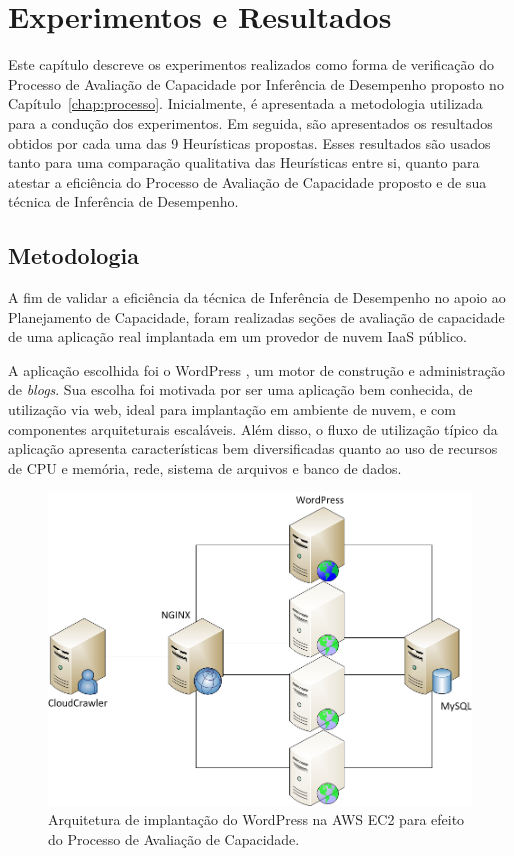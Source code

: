 \chapter{Experimentos e Resultados}
\label{chap:resultados}
Este capítulo descreve os experimentos realizados como forma de
verificação do Processo de Avaliação de Capacidade por Inferência de 
Desempenho proposto no Capítulo~\ref{chap:processo}. Inicialmente, é
apresentada a metodologia utilizada para a condução dos experimentos. Em seguida, 
são apresentados os resultados obtidos por cada uma das 9 Heurísticas propostas. Esses resultados são usados 
tanto para uma comparação qualitativa das Heurísticas entre si, quanto para atestar
a eficiência do Processo de Avaliação de Capacidade proposto e de sua técnica 
de Inferência de Desempenho.

\section{Metodologia}
\label{sec:resultados_metodologia}
A fim de validar a eficiência da técnica de Inferência de Desempenho no apoio
ao Planejamento de Capacidade, foram realizadas seções de avaliação de
capacidade de uma aplicação real implantada em um provedor de nuvem IaaS público.

A aplicação escolhida foi o WordPress \cite{wordpress}, um motor de construção 
e administração de \emph{blogs}. Sua escolha foi motivada por ser uma aplicação
bem conhecida, de utilização via web, ideal para implantação em ambiente de
nuvem, e com componentes arquiteturais escaláveis. Além disso, o fluxo de 
utilização típico da aplicação apresenta características bem diversificadas quanto ao uso
de recursos de CPU e memória, rede, sistema de arquivos e banco de dados.

\begin{figure}[t]
  \begin{center}
    \includegraphics[scale=0.4]{img/ImplantacaoWordPress}
  \end{center}
  \caption{\label{fig:implantacao}Arquitetura de implantação do WordPress na AWS EC2 para efeito do Processo de Avaliação de Capacidade.}
\end{figure}

